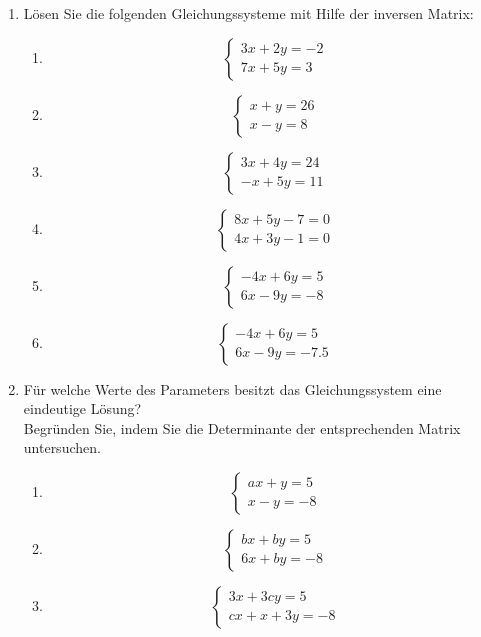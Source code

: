 \begin{ueb}
    {}{}

\begin{enumerate}
    \item Lösen Sie die folgenden Gleichungssysteme mit Hilfe der inversen Matrix:
    \begin{enumerate}
      \item
      \[
      \begin{cases}
      3x + 2y = -2 \\
      7x + 5y = 3
      \end{cases}
      \]
      \item
      \[
      \begin{cases}
      x + y = 26 \\
      x - y = 8
      \end{cases}
      \]
      \item
      \[
      \begin{cases}
      3x + 4y = 24 \\
      -x + 5y = 11
      \end{cases}
      \]
      \item
      \[
      \begin{cases}
      8x + 5y - 7 = 0 \\
      4x + 3y - 1 = 0
      \end{cases}
      \]
      \item
      \[
      \begin{cases}
      -4x + 6y = 5 \\
      6x - 9y = -8
      \end{cases}
      \]
      \item
      \[
      \begin{cases}
      -4x + 6y = 5 \\
      6x - 9y = -7.5
      \end{cases}
      \]
    \end{enumerate}
  
    \item Für welche Werte des Parameters besitzt das Gleichungssystem eine eindeutige Lösung?\\
    Begründen Sie, indem Sie die Determinante der entsprechenden Matrix untersuchen.
    \begin{enumerate}
      \item
      \[
      \begin{cases}
      ax + y = 5 \\
      x - y = -8
      \end{cases}
      \]
      \item
      \[
      \begin{cases}
      bx + by = 5 \\
      6x + by = -8
      \end{cases}
      \]
      \item
      \[
      \begin{cases}
      3x + 3cy = 5 \\
      cx + x + 3y = -8
      \end{cases}
      \]
    \end{enumerate}
  \end{enumerate}
  

\end{ueb}
